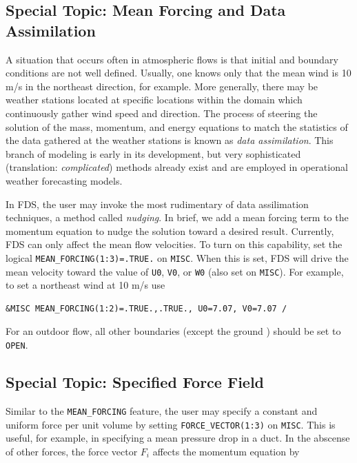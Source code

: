 \documentclass[11pt]{book}
\newcommand{\ct}{\tt\small}
\begin{document}
\subsection{Special Topic: Mean Forcing and Data Assimilation}
\label{info:mean_forcing}

A situation that occurs often in atmospheric flows is that initial and boundary conditions are not well defined.  Usually, one knows only that the mean wind is 10 m/s in the northeast direction, for example.  More generally, there may be weather stations located at specific locations within the domain which continuously gather wind speed and direction.  The process of steering the solution of the mass, momentum, and energy equations to match the statistics of the data gathered at the weather stations is known as \emph{data assimilation}.  This branch of modeling is early in its development, but very sophisticated (translation: \emph{complicated}) methods already exist \cite{Kalnay:2003} and are employed in operational weather forecasting models.

In FDS, the user may invoke the most rudimentary of data assilimation techniques, a method called \emph{nudging}.  In brief, we add a mean forcing term to the momentum equation to nudge the solution toward a desired result.  Currently, FDS can only affect the mean flow velocities.  To turn on this capability, set the logical {\ct MEAN\_FORCING(1:3)=.TRUE.} on {\ct MISC}.  When this is set, FDS will drive the mean velocity toward the value of {\ct U0}, {\ct V0}, or {\ct W0} (also set on {\ct MISC}).  For example, to set a northeast wind at 10 m/s use

\footnotesize
\begin{verbatim}
&MISC MEAN_FORCING(1:2)=.TRUE.,.TRUE., U0=7.07, V0=7.07 /
\end{verbatim}
\normalsize

\noindent For an outdoor flow, all other boundaries (except the ground ) should be set to {\ct OPEN}.

\subsection{Special Topic: Specified Force Field}
\label{info:force_vector}

Similar to the {\ct MEAN\_FORCING} feature, the user may specify a constant and uniform force per unit volume by setting {\ct FORCE\_VECTOR(1:3)} on {\ct MISC}.  This is useful, for example, in specifying a mean pressure drop in a duct.  In the abscense of other forces, the force vector $F_i$ affects the momentum equation by
\end{document}
